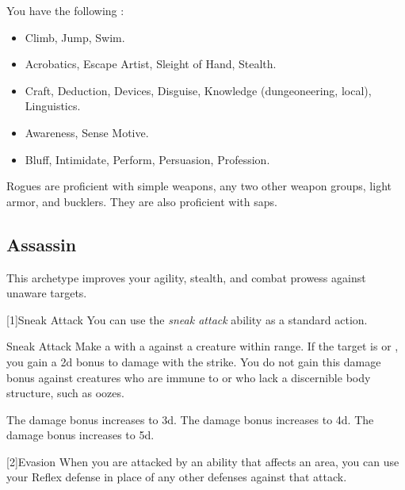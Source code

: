         You have the following :
        \begin{itemize}
            \item {} Climb, Jump, Swim.
            \item {} Acrobatics, Escape Artist, Sleight of Hand, Stealth.
            \item {} Craft, Deduction, Devices, Disguise, Knowledge (dungeoneering, local), Linguistics.
            \item {} Awareness, Sense Motive.
            \item {} Bluff, Intimidate, Perform, Persuasion, Profession.
        \end{itemize}

        Rogues are proficient with simple weapons, any two other weapon groups, light armor, and bucklers.
        They are also proficient with saps.

    \subsection{Assassin}
        This archetype improves your agility, stealth, and combat prowess against unaware targets.

        [1]{Sneak Attack} You can use the \textit{sneak attack} ability as a standard action.
        \begin{freeability}{Sneak Attack}
            Make a  with a  against a creature within \rngclose range.
            If the target is \unaware or , you gain a \plus2d bonus to damage with the strike.
            You do not gain this damage bonus against creatures who are immune to  or who lack a discernible body structure, such as oozes.

            \rankline
             The damage bonus increases to \plus3d.
             The damage bonus increases to \plus4d.
             The damage bonus increases to \plus5d.
        \end{freeability}

        [2]{Evasion} When you are attacked by an ability that affects an area, you can use your Reflex defense in place of any other defenses against that attack.

